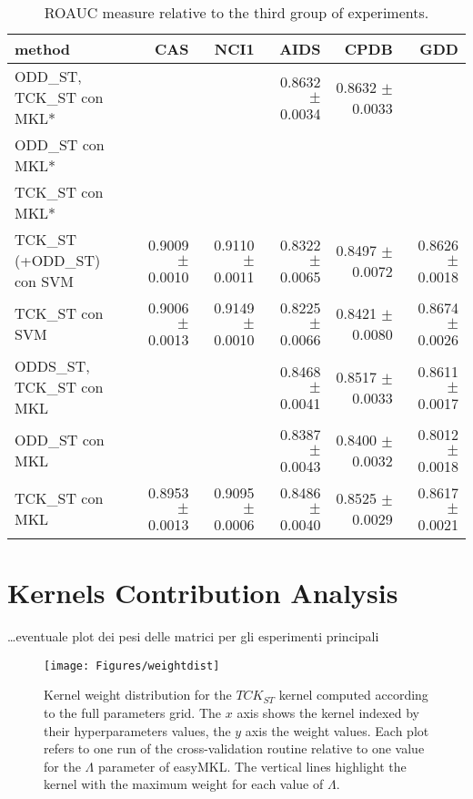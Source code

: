 \begin{landscape}
    \begin{table}[ht]
        \centering
        \begin{tabular}{|l|r|r|r|r|r|}
            \hline
            method&CAS&NCI1&AIDS&CPDB&GDD\\
            \hline
            ODD\_ST, TCK\_ST con MKL*&&&0.8632 $\pm$ 0.0034&0.8632 $\pm$ 0.0033&\\
            \hline
            ODD\_ST con MKL*&&&&&\\
            \hline
            TCK\_ST con MKL*&&&&&\\
            \hline
            TCK\_ST (+ODD\_ST) con SVM&0.9009 $\pm$ 0.0010&0.9110 $\pm$ 0.0011&0.8322 $\pm$ 0.0065&0.8497 $\pm$ 0.0072&0.8626 $\pm$ 0.0018\\
            \hline
            TCK\_ST con SVM&0.9006 $\pm$ 0.0013&0.9149 $\pm$ 0.0010&0.8225 $\pm$ 0.0066&0.8421 $\pm$ 0.0080&0.8674 $\pm$ 0.0026\\
            \hline
            ODDS\_ST, TCK\_ST con MKL&&&0.8468 $\pm$ 0.0041&0.8517 $\pm$ 0.0033&0.8611 $\pm$ 0.0017\\
            \hline
            ODD\_ST con MKL&&&0.8387 $\pm$ 0.0043&0.8400 $\pm$ 0.0032&0.8012$\pm$ 0.0018\\
            \hline
            TCK\_ST con MKL&0.8953 $\pm$ 0.0013&0.9095 $\pm$ 0.0006&0.8486 $\pm$ 0.0040&0.8525 $\pm$ 0.0029&0.8617 $\pm$ 0.0021\\
            \hline
        \end{tabular}
        \label{table:results_wl}
        \caption{ROAUC measure relative to the third group of experiments. }
    \end{table}
\end{landscape}

\section{Kernels Contribution Analysis}
\dots eventuale plot dei pesi delle matrici per gli esperimenti principali

\begin{figure}[ht]
    \centering
    \texttt{[image: Figures/weightdist]}
    \caption{Kernel weight distribution for the $TCK_{ST}$ kernel
    computed according to the full parameters grid.
    The $x$ axis shows the kernel indexed by their hyperparameters values,
    the $y$ axis the weight values.
    Each plot refers to one run of the cross-validation routine relative to one
    value for the $\Lambda$ parameter of easyMKL. The vertical lines highlight
    the kernel with the maximum weight for each value of $\Lambda$.}
        \label{fig:weightdist}
\end{figure}


